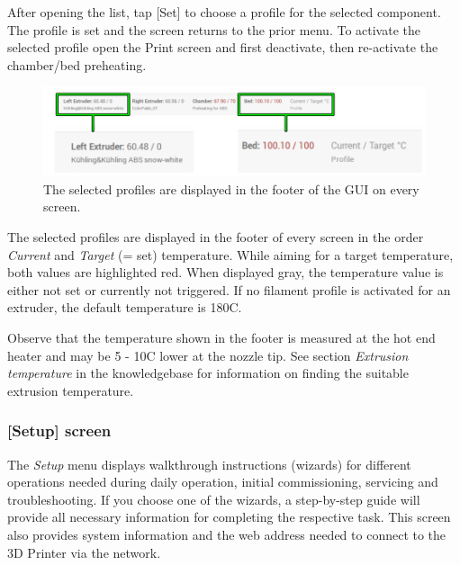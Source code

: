 After opening the list, tap [Set] to choose a profile for the selected component. The profile is set and the screen returns to the prior menu.
To activate the selected profile open the Print screen and first deactivate, then re-activate the chamber/bed preheating. 

\begin{figure}[H]
  \centering
  \includegraphics[width=.7\linewidth]{./img/gui_configmenu_3_v110.png}
  \caption{The selected profiles are displayed in the footer of the GUI on every 
           screen.}
\end{figure}

The selected profiles are displayed in the footer of every screen in the order 
\emph{Current} and \emph{Target} (= set) temperature. While aiming for a target temperature, both values are highlighted red. When displayed gray, the temperature value is either not set or currently not triggered.
If no filament profile is activated for an extruder, the default temperature is 
180\degree C. 

\begin{info}
  Observe that the temperature shown in the footer is measured at the hot end heater and may be 5 - 10\degree C lower at the nozzle tip.
  See section \emph{Extrusion temperature} in the knowledgebase for information on finding the suitable extrusion temperature.
\end{info}


\subsubsection{[Setup] screen}

The \emph{Setup} menu displays walkthrough instructions (wizards) for different operations needed during daily operation, initial commissioning, servicing and troubleshooting. If you choose one of the wizards, a step-by-step guide will provide all necessary information for completing the respective task.
This screen also provides system information and the web address needed to connect to the 3D Printer via the network. 

